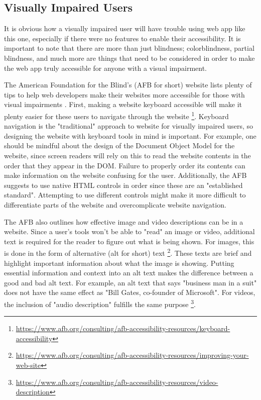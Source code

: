 \documentclass[10pt,twocolumn]{article}
\begin{document}
\subsection{Visually Impaired Users}

It is obvious how a visually impaired user will have trouble using web app like this one, especially if there were no features to enable their accessibility.
It is important to note that there are more than just blindness; colorblindness, partial blindness, and much more are things that need to be considered in order to make the web app truly accessible for anyone with a visual impairment.

The American Foundation for the Blind's (AFB for short) website lists plenty of tips to help web developers make their websites more accessible for those with visual impairments \cite{AFBAccessibilityResources}.
First, making a website keyboard accessible will make it plenty easier for these users to navigate through the website \footnote{\url{https://www.afb.org/consulting/afb-accessibility-resources/keyboard-accessibility}}.
Keyboard navigation is the "traditional" approach to website for visually impaired users, so designing the website with keyboard tools in mind is important.
For example, one should be mindful about the design of the Document Object Model for the website, since screen readers will rely on this to read the website contents in the order that they appear in the DOM.
Failure to properly order its contents can make information on the website confusing for the user.
Additionally, the AFB suggests to use native HTML controls in order since these are an "established standard". Attempting to use different controls might make it more difficult to differentiate parts of the website and overcomplicate website navigation.

The AFB also outlines how effective image and video descriptions can be in a website.
Since a user's tools won't be able to "read" an image or video, additional text is required for the reader to figure out what is being shown.
For images, this is done in the form of alternative (alt for short) text \footnote{\url{https://www.afb.org/consulting/afb-accessibility-resources/improving-your-web-site}}.
These texts are brief and highlight important information about what the image is showing.
Putting essential information and context into an alt text makes the difference between a good and bad alt text.
For example, an alt text that says "business man in a suit" does not have the same effect as "Bill Gates, co-founder of Microsoft".
For videos, the inclusion of "audio description" fulfills the same purpose \footnote{\url{https://www.afb.org/consulting/afb-accessibility-resources/video-description}}.
\end{document}
